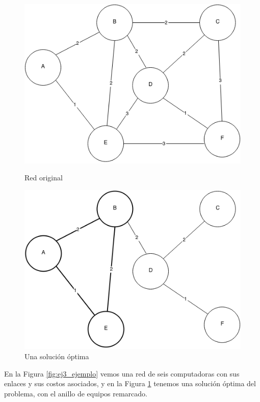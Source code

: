 \begin{figure}[ht]
	\begin{minipage}[t]{0.5\linewidth}
		\centering
		\includegraphics[width=\textwidth]{ej3_ejemplo.png}
		\caption{Red original}
		\label{fig:ej3_ejemplo}
	\end{minipage}
	\begin{minipage}[t]{0.5\linewidth}
		\centering
		\includegraphics[width=\textwidth]{ej3_ejemplo_solucion_optima.png}
		\caption{Una solución óptima}
		\label{fig:ej3_ejemplo_solucion_optima}
	\end{minipage}
\end{figure}

En la Figura \ref{fig:ej3_ejemplo} vemos una red de seis computadoras con sus enlaces y sus costos asociados, y en la Figura \ref{fig:ej3_ejemplo_solucion_optima} tenemos una solución óptima del problema, con el anillo de equipos remarcado.

